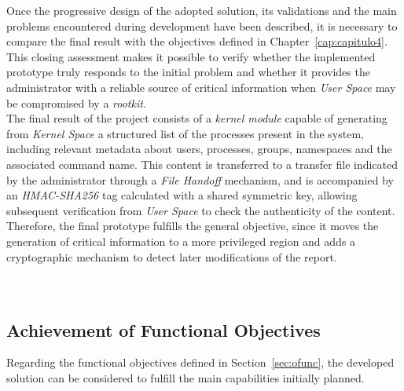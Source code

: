 Once the progressive design of the adopted solution, its validations and the main problems encountered during development have been described, it is necessary to compare the final result with the objectives defined in Chapter~\ref{cap:capitulo4}.
This closing assessment makes it possible to verify whether the implemented prototype truly responds to the initial problem and whether it provides the administrator with a reliable source of critical information when \textit{User Space} may be compromised by a \textit{rootkit}.\\

The final result of the project consists of a \textit{kernel module} capable of generating from \textit{Kernel Space} a structured list of the processes present in the system, including relevant metadata about users, processes, groups, namespaces and the associated command name.
This content is transferred to a transfer file indicated by the administrator through a \textit{File Handoff} mechanism, and is accompanied by an \textit{HMAC-SHA256} tag calculated with a shared symmetric key, allowing subsequent verification from \textit{User Space} to check the authenticity of the content.\\

Therefore, the final prototype fulfills the general objective, since it moves the generation of critical information to a more privileged region and adds a cryptographic mechanism to detect later modifications of the report.\\\\

\

\subsection{Achievement of Functional Objectives}

Regarding the functional objectives defined in Section~\ref{sec:ofunc}, the developed solution can be considered to fulfill the main capabilities initially planned.\\

